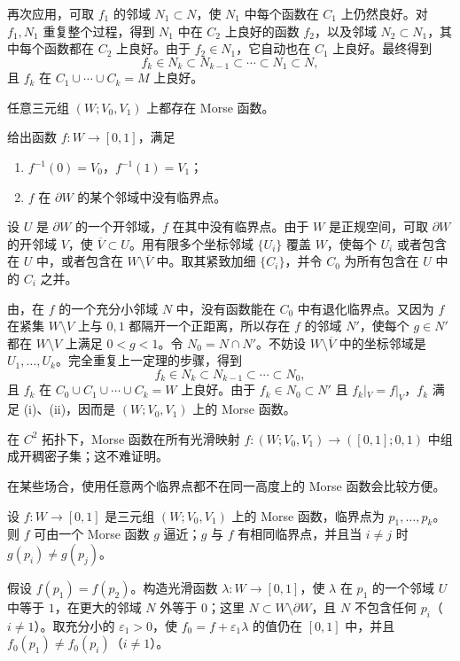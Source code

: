 再次应用，可取 $f_1$ 的邻域 $N_1\subset N$，使 $N_1$ 中每个函数在 $C_1$ 上仍然良好。对 $f_1,N_1$ 重复整个过程，得到 $N_1$ 中在 $C_2$ 上良好的函数 $f_2$，以及邻域 $N_2\subset N_1$，其中每个函数都在 $C_2$ 上良好。由于 $f_2\in N_1$，它自动也在 $C_1$ 上良好。最终得到
\[
 f_k\in N_k\subset N_{k-1}\subset\cdots\subset N_1\subset N,
\]
且 $f_k$ 在 $C_1\cup\cdots\cup C_k=M$ 上良好。
\EndProof

\label{thm:2.5-restated}任意三元组 $(W;V_0,V_1)$ 上都存在 Morse 函数。

\Proof {} 给出函数 $f:W\to[0,1]$，满足
\begin{enumerate}[label=(\roman*)]
  \item $f^{-1}(0)=V_0$，$f^{-1}(1)=V_1$；
  \item $f$ 在 $\partial W$ 的某个邻域中没有临界点。
\end{enumerate}
设 $U$ 是 $\partial W$ 的一个开邻域，$f$ 在其中没有临界点。由于 $W$ 是正规空间，可取 $\partial W$ 的开邻域 $V$，使 $\overline V\subset U$。用有限多个坐标邻域 $\{U_i\}$ 覆盖 $W$，使每个 $U_i$ 或者包含在 $U$ 中，或者包含在 $W\setminus\overline V$ 中。取其紧致加细 $\{C_i\}$，并令 $C_0$ 为所有包含在 $U$ 中的 $C_i$ 之并。

由，在 $f$ 的一个充分小邻域 $N$ 中，没有函数能在 $C_0$ 中有退化临界点。又因为 $f$ 在紧集 $W\setminus V$ 上与 $0,1$ 都隔开一个正距离，所以存在 $f$ 的邻域 $N'$，使每个 $g\in N'$ 都在 $W\setminus V$ 上满足 $0<g<1$。令 $N_0=N\cap N'$。不妨设 $W\setminus\overline V$ 中的坐标邻域是 $U_1,\ldots,U_k$。完全重复上一定理的步骤，得到
\[
  f_k\in N_k\subset N_{k-1}\subset\cdots\subset N_0,
\]
且 $f_k$ 在 $C_0\cup C_1\cup\cdots\cup C_k=W$ 上良好。由于 $f_k\in N_0\subset N'$ 且 $f_k|_V=f|_V$，$f_k$ 满足 (i)、(ii)，因而是 $(W;V_0,V_1)$ 上的 Morse 函数。
\EndProof

\label{proof:2-5-end}
\Remark 在 $C^2$ 拓扑下，Morse 函数在所有光滑映射 $f:(W;V_0,V_1)\to([0,1];0,1)$ 中组成开稠密子集；这不难证明。

在某些场合，使用任意两个临界点都不在同一高度上的 Morse 函数会比较方便。

设 $f:W\to[0,1]$ 是三元组 $(W;V_0,V_1)$ 上的 Morse 函数，临界点为 $p_1,\ldots,p_k$。则 $f$ 可由一个 Morse 函数 $g$ 逼近；$g$ 与 $f$ 有相同临界点，并且当 $i\neq j$ 时 $g(p_i)\neq g(p_j)$。

\Proof 假设 $f(p_1)=f(p_2)$。构造光滑函数 $\lambda:W\to[0,1]$，使 $\lambda$ 在 $p_1$ 的一个邻域 $U$ 中等于 $1$，在更大的邻域 $N$ 外等于 $0$；这里 $N\subset W\setminus\partial W$，且 $N$ 不包含任何 $p_i$（$i\neq1$）。取充分小的 $\varepsilon_1>0$，使 $f_0=f+\varepsilon_1\lambda$ 的值仍在 $[0,1]$ 中，并且 $f_0(p_1)\neq f_0(p_i)$（$i\neq1$）。

